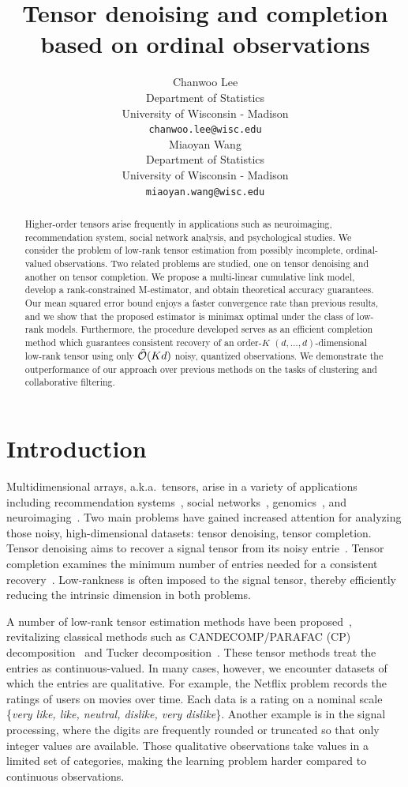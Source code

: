 \documentclass{article}
\title{Tensor denoising and completion based on ordinal observations}
\author{
 Chanwoo Lee \\
  Department of Statistics\\
  University of Wisconsin - Madison\\
  \texttt{chanwoo.lee@wisc.edu} \\
   \And
  Miaoyan Wang \\
  Department of Statistics\\
  University of Wisconsin - Madison\\
  \texttt{miaoyan.wang@wisc.edu} \\
}
\theoremstyle{plain}
\theoremstyle{definition}
\begin{document}
\maketitle
\begin{abstract}
Higher-order tensors arise frequently in applications such as neuroimaging, recommendation system, social network analysis, and psychological studies. We consider the problem of low-rank tensor estimation from possibly incomplete, ordinal-valued observations. Two related problems are studied, one on tensor denoising and another on tensor completion. We propose a multi-linear cumulative link model, develop a rank-constrained M-estimator, and obtain theoretical accuracy guarantees. Our mean squared error bound enjoys a faster convergence rate than previous results, and we show that the proposed estimator is minimax optimal under the class of low-rank models. Furthermore, the procedure developed serves as an efficient completion method which guarantees consistent recovery of an order-$K$ $(d,\ldots,d)$-dimensional low-rank tensor using only $\tilde {\mathcal{O}}(Kd)$ noisy, quantized observations. We demonstrate the outperformance of our approach over previous methods on the tasks of clustering and collaborative filtering.
\end{abstract}
\vspace{-.3cm}
\section{Introduction}
\vspace{-.2cm}
Multidimensional arrays, a.k.a.\ tensors, arise in a variety of applications including recommendation systems~\citep{baltrunas2011incarmusic}, social networks~\citep{nickel2011three}, genomics~\citep{hore2016tensor}, and neuroimaging~\citep{zhou2013tensor}. 
Two main problems have gained increased attention for analyzing those noisy, high-dimensional datasets: tensor denoising, tensor completion.
Tensor denoising aims to recover a signal tensor from its noisy entrie~\citep{xia2019sup,zeng2019multiway}. Tensor completion examines the minimum number of entries needed for a consistent recovery~\citep{ghadermarzy2018learning,ghadermarzy2019near}. Low-rankness is often imposed to the signal tensor, 
thereby efficiently reducing the intrinsic dimension in both problems.

A number of low-rank tensor estimation methods have been proposed~\citep{kolda2009tensor,acar2010scalable}, revitalizing classical methods such as CANDECOMP/PARAFAC (CP) decomposition~\citep{hitchcock1927expression} and Tucker decomposition~\citep{tucker1966some}. These tensor methods treat the entries as continuous-valued. In many cases, however, we encounter datasets of which the entries are qualitative. For example, the Netflix problem records the ratings of users on movies over time. Each data is a rating on a nominal scale \{{\it very like, like, neutral, dislike, very dislike}\}. Another example is in the signal processing, where the digits are frequently rounded or truncated so that only integer values are available. Those qualitative observations take values in a limited set of categories, making the learning problem harder compared to  continuous observations.
\end{document}
